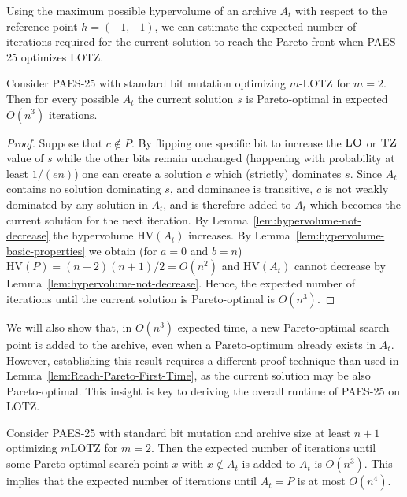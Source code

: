 \documentclass[
sigconf = false, %
review = false, %
screen = true, %
anonymous = true, %
format=acmsmall
]{acmart}
\newcommand{\hv}{\ensuremath{\mathrm{HV}}\xspace}
\newcommand{\LOTZ}{\textsc{LOTZ}\xspace}
\newcommand{\mLOTZ}{\ensuremath{m}\text{-}\textsc{LOTZ}\xspace}
\newcommand{\LO}{\textsc{LO}\xspace}                      %
\newcommand{\TZ}{\textsc{TZ}\xspace}
\newcommand{\PAES}{PAES-25\xspace}
\begin{document}
Using the maximum possible hypervolume of an archive $A_t$ with respect to the reference point $h=(-1,-1)$, we can estimate the expected number of iterations required for the current solution to reach the Pareto front when \PAES optimizes \LOTZ.   

\begin{lemma}
\label{lem:Reach-Pareto-First-Time}
Consider \PAES with standard bit mutation optimizing $m$-\LOTZ for $m = 2$. Then for every possible $A_t$ the current solution $s$ is Pareto-optimal in expected $O(n^3)$ iterations. 
\end{lemma}

\begin{proof}
  Suppose that $c \notin P$. By flipping one specific bit to increase the $\LO$ or $\TZ$ value of $s$ while the other bits remain unchanged (happening with probability at least $1/(en)$) one can create a solution $c$ which (strictly) dominates $s$. Since $A_t$ contains no solution dominating $s$, and dominance is transitive, $c$ is not weakly dominated by any solution in $A_t$, and is therefore added to $A_t$ which becomes the current solution for the next iteration. By Lemma~\ref{lem:hypervolume-not-decrease} the hypervolume $\hv(A_t)$ increases. By Lemma~\ref{lem:hypervolume-basic-properties} we obtain (for $a=0$ and $b=n$) $\hv(P) = (n+2)(n+1)/2 = O(n^2)$ and $\hv(A_t)$ cannot decrease by Lemma~\ref{lem:hypervolume-not-decrease}. Hence, the expected number of iterations until the current solution is Pareto-optimal is $O(n^3)$.
\end{proof}

We will also show that, in $O(n^3)$ expected time, a new Pareto-optimal search point is added to the archive, even when a Pareto-optimum already exists in $A_t$. However, establishing this result requires a different proof technique than used in Lemma~\ref{lem:Reach-Pareto-First-Time}, as the current solution may be also Pareto-optimal. This insight is key to deriving the overall runtime of \PAES on \LOTZ.

\begin{theorem}
\label{thm:spreading-Pareto-front-standard}
Consider \PAES with standard bit mutation and archive size at least $n+1$ optimizing \mLOTZ for $m = 2$. Then the expected number of iterations until some Pareto-optimal search point $x$ with $x \notin A_t$ is added to $A_t$ is $O(n^3)$. This implies that the expected number of iterations until $A_t=P$ is at most $O(n^4)$.
\end{theorem}
\end{document}

